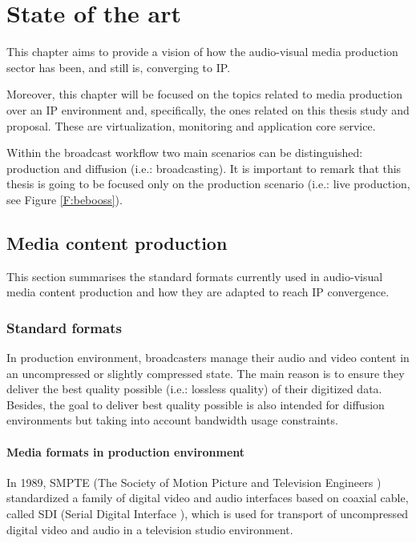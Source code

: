 \chapter{State of the art}\label{A:stateOfTheArt}

This chapter aims to provide a vision of how the audio-visual media production sector has been, and still is, converging to IP.

Moreover, this chapter will be focused on the topics related to media production over an IP environment and, specifically, the ones related on this thesis study and proposal. These are virtualization, monitoring and application core service.

Within the broadcast workflow two main scenarios can be distinguished: production and diffusion (i.e.: broadcasting). It is important to remark that this thesis is going to be focused only on the production scenario (i.e.: live production, see Figure \ref{F:bebooss}).

\section{Media content production}

This section summarises the standard formats currently used in audio-visual media content production and how they are adapted to reach IP convergence.

\subsection{Standard formats}

In production environment, broadcasters manage their audio and video content in an uncompressed or slightly compressed state. The main reason is to ensure they deliver the best quality possible (i.e.: lossless quality) of their digitized data. Besides, the goal to deliver best quality possible is also intended for diffusion environments but taking into account bandwidth usage constraints.

\subsubsection{Media formats in production environment}

In 1989, SMPTE (The Society of Motion Picture and Television Engineers \cite{smpte}) standardized a family of digital video and audio interfaces based on coaxial cable, called SDI (Serial Digital Interface \cite{SDI}), which is used for transport of uncompressed digital video and audio in a television studio environment. 

